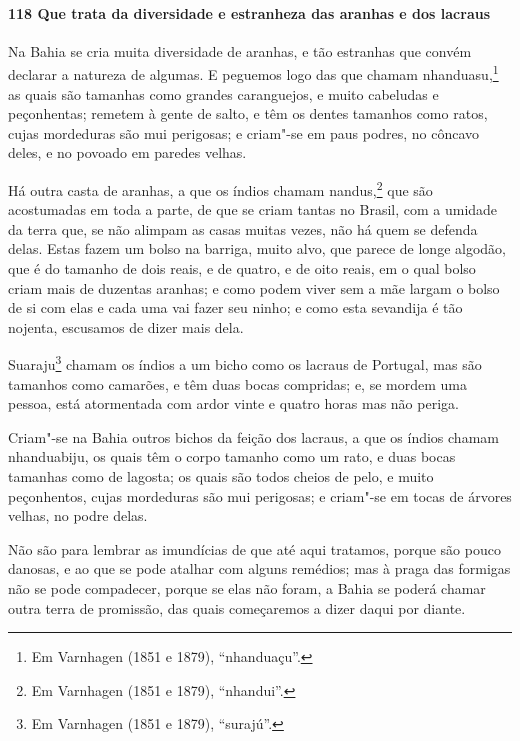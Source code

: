 \begin{linenumbers}
\paragraph{118 Que trata da diversidade e estranheza das aranhas e dos lacraus}\quad
Na Bahia se cria muita diversidade de aranhas, e tão estranhas que convém declarar a
natureza de algumas. E peguemos logo das que chamam nhanduasu,\footnote{ Em Varnhagen (1851
e 1879), ``nhanduaçu''.} as quais são tamanhas como grandes caranguejos, e muito
cabeludas e peçonhentas; remetem à gente de salto, e têm os dentes tamanhos como ratos,
cujas mordeduras são mui perigosas; e criam"-se em paus podres, no côncavo deles, e no
povoado em paredes velhas.

Há outra casta de aranhas, a que os índios chamam nandus,\footnote{ Em Varnhagen (1851 e
1879), ``nhandui''.} que são acostumadas em toda a parte, de que se criam tantas no
Brasil, com a umidade da terra que, se não alimpam as casas muitas vezes, não há quem se
defenda delas. Estas fazem um bolso na barriga, muito alvo, que parece de longe algodão,
que é do tamanho de dois reais, e de quatro, e de oito reais, em o qual bolso criam mais
de duzentas aranhas; e como podem viver sem a mãe largam o bolso de si com elas e cada uma
vai fazer seu ninho; e como esta sevandija é tão nojenta, escusamos de dizer mais dela.

Suaraju\footnote{ Em Varnhagen (1851 e 1879), ``surajú''.} chamam os índios a um bicho
como os lacraus de Portugal, mas são tamanhos como camarões, e têm duas bocas compridas;
e, se mordem uma pessoa, está atormentada com ardor vinte e quatro horas mas não periga.

Criam"-se na Bahia outros bichos da feição dos lacraus, a que os índios chamam nhanduabiju,
os quais têm o corpo tamanho como um rato, e duas bocas tamanhas como de lagosta; os quais
são todos cheios de pelo, e muito peçonhentos, cujas mordeduras são mui perigosas; e
criam"-se em tocas de árvores velhas, no podre delas.

Não são para lembrar as imundícias de que até aqui tratamos, porque são pouco danosas, e
ao que se pode atalhar com alguns remédios; mas à praga das formigas não se pode
compadecer, porque se elas não foram, a Bahia se poderá chamar outra terra de promissão,
das quais começaremos a dizer daqui por diante.


\end{linenumbers}
